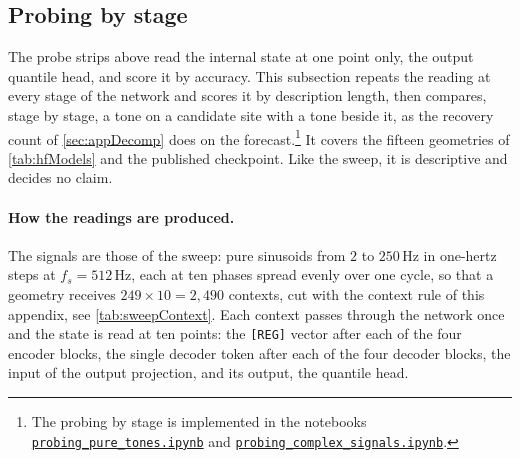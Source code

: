 {\color{red}
\subsection{Probing by stage}\label{sec:appSweepMDL}

The probe strips above read the internal state at one point only, the output quantile head, and score it by accuracy. This subsection repeats the reading at every stage of the network and scores it by description length, then compares, stage by stage, a tone on a candidate site with a tone beside it, as the recovery count of \autoref{sec:appDecomp} does on the forecast.\footnote{\color{red}The probing by stage is implemented in the notebooks \href{https://github.com/FedericoSabbadini/patchAliasing/blob/main/notebooks/signal_analysis/probing_pure_tones.ipynb}{\texttt{probing\_pure\_tones.ipynb}} and \href{https://github.com/FedericoSabbadini/patchAliasing/blob/main/notebooks/signal_analysis/probing_complex_signals.ipynb}{\texttt{probing\_complex\_signals.ipynb}}.} It covers the fifteen geometries of \autoref{tab:hfModels} and the published checkpoint. Like the sweep, it is descriptive and decides no claim.

\paragraph{How the readings are produced.}

The signals are those of the sweep: pure sinusoids from $2$ to $250$\,Hz in one-hertz steps at $f_s=512$\,Hz, each at ten phases spread evenly over one cycle, so that a geometry receives $249\times10=2{,}490$ contexts, cut with the context rule of this appendix, see \autoref{tab:sweepContext}. Each context passes through the network once and the state is read at ten points: the \texttt{[REG]} vector after each of the four encoder blocks, the single decoder token after each of the four decoder blocks, the input of the output projection, and its output, the quantile head.

}
